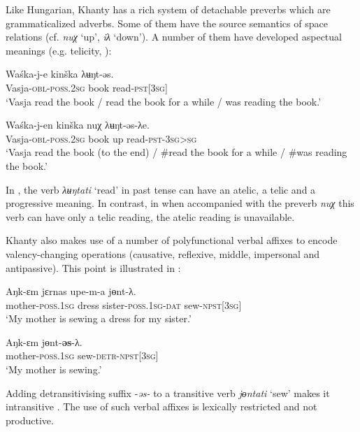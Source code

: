 \documentclass[output=paper]{langscibook}
\begin{document}
Like Hungarian, Khanty has a rich system of detachable preverbs which are grammaticalized adverbs. Some of them have the source semantics of space relations (cf. \textit{nuχ} ‘up’, \textit{iλ} ‘down’). A number of them have developed aspectual meanings (e.g. telicity, \citealt{Kozlov2019}): 

\ea 
\label{ex:Volkova:8}
	\ea
	\label{ex:Volkova:8a}
 	 \gll Waśka-j-e kinška λʉŋt-əs.\\
  	 Vasja\textsc{{}-obl-poss.2sg} book read\textsc{{}-pst[3sg]}\\
  	 \glt ‘Vasja read the book / read the book for a while / was reading the book.’

	\ex
	\label{ex:Volkova:8b}
  	 \gll Waśka-j-en kinška nuχ λʉŋt-əs-λe.\\
  	 Vasja\textsc{{}-obl-poss.2sg} book up read-\textsc{pst-3sg>sg}\\
  	 \glt ‘Vasja read the book (to the end) / \#read the book for a while / \#was reading the book.’
	\z
\z

In , the verb \textit{λʉŋtati} ‘read’ in past tense can have an atelic, a telic and a progressive meaning. In contrast, in  when accompanied with the preverb \textit{nuχ} this verb can have only a telic reading, the atelic reading is unavailable. 

Khanty also makes use of a number of polyfunctional verbal affixes to encode %
valency-changing operations (causative, reflexive, middle, impersonal and antipassive). This point is illustrated in : 

\ea 
\label{ex:Volkova:9}
	\ea
	\label{ex:Volkova:9a}
  	 \gll Aŋk-ɛm jɛrnas upe-m{}-a jɵnt-λ.\\
  	 mother\textsc{{}-poss.1sg} dress sister\textsc{{}-poss.1sg{}-dat} sew\textsc{{}-npst[}3\textsc{sg}]\\
  	 \glt ‘My mother is sewing a dress for my sister.’

	\ex
	\label{ex:Volkova:9b}
  	 \gll Aŋk-ɛm jɵnt-\textbf{əs}{}-λ.\\
  	 mother\textsc{{}-poss.1sg} sew\textsc{{}-detr-npst[3sg]}\\
  	 \glt ‘My mother is sewing.’
	\z
\z
 

Adding detransitivising suffix -\textit{əs-} to a transitive verb \textit{jɵntati} ‘sew’  makes it intransitive . The use of such verbal affixes is lexically restricted and not productive.
\end{document}
